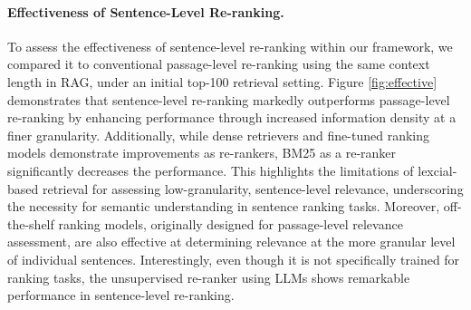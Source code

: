 % 


\paragraph{Effectiveness of Sentence-Level Re-ranking.} 


To assess the effectiveness of sentence-level re-ranking within our framework, we compared it to conventional passage-level re-ranking using the same context length in RAG, under an initial top-100 retrieval setting. Figure \ref{fig:effective} demonstrates that sentence-level re-ranking markedly outperforms passage-level re-ranking by enhancing performance through increased information density at a finer granularity. Additionally, while dense retrievers and fine-tuned ranking
models demonstrate improvements as re-rankers, BM25 as a re-ranker significantly decreases the performance. This highlights the limitations of lexcial-based retrieval for assessing low-granularity, sentence-level relevance, underscoring the necessity for semantic understanding in sentence ranking tasks.
Moreover, off-the-shelf ranking models, originally designed for passage-level relevance assessment, are also effective at determining relevance at the more granular level of individual sentences. Interestingly, even though it is not specifically trained for ranking tasks, the unsupervised re-ranker using LLMs shows remarkable performance in sentence-level re-ranking.




